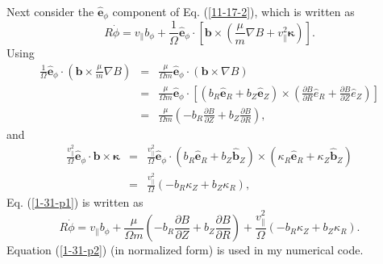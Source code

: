 \documentclass{article}
\begin{document}
Next consider the $\hat{\mathbf{e}}_{\phi}$ component of Eq. (\ref{11-17-2}),
which is written as
\begin{equation}
  \label{1-31-p1} R \dot{\phi} = v_{\parallel} b_{\phi} + \frac{1}{\Omega}
  \hat{\mathbf{e}}_{\phi} \cdot \left[ \mathbf{b} \times \left( \frac{\mu}{m}
  \nabla B + v_{\parallel}^2 \mathbf{\kappa} \right) \right] .
\end{equation}
Using
\begin{eqnarray}
  \frac{1}{\Omega} \hat{\mathbf{e}}_{\phi} \cdot \left( \mathbf{b} \times
  \frac{\mu}{m} \nabla B \right) & = & \frac{\mu}{\Omega m}
  \hat{\mathbf{e}}_{\phi} \cdot (\mathbf{b} \times \nabla B) \nonumber\\
  & = & \frac{\mu}{\Omega m} \hat{\mathbf{e}}_{\phi} \cdot \left[ (b_R
  \hat{\mathbf{e}}_R + b_Z \hat{\mathbf{e}}_Z) \times \left( \frac{\partial
  B}{\partial R} \hat{e}_R + \frac{\partial B}{\partial Z} \hat{e}_Z \right)
  \right] \nonumber\\
  & = & \frac{\mu}{\Omega m} \left( - b_R  \frac{\partial B}{\partial Z} +
  b_Z  \frac{\partial B}{\partial R} \right), 
\end{eqnarray}
and
\begin{eqnarray}
  \frac{v_{\parallel}^2}{\Omega} \hat{\mathbf{e}}_{\phi} \cdot \mathbf{b}
  \times \mathbf{\kappa} & = & \frac{v_{\parallel}^2}{\Omega}
  \hat{\mathbf{e}}_{\phi} \cdot (b_R \hat{\mathbf{e}}_R + b_Z
  \hat{\mathbf{b}}_Z) \times (\kappa_R \hat{\mathbf{e}}_R + \kappa_Z
  \hat{\mathbf{b}}_Z) \nonumber\\
  & = & \frac{v_{\parallel}^2}{\Omega} (- b_R \kappa_Z + b_Z \kappa_R), 
\end{eqnarray}
Eq. (\ref{1-31-p1}) is written as
\begin{equation}
  \label{1-31-p2} R \dot{\phi} = v_{\parallel} b_{\phi} + \frac{\mu}{\Omega m}
  \left( - b_R  \frac{\partial B}{\partial Z} + b_Z  \frac{\partial
  B}{\partial R} \right) + \frac{v_{\parallel}^2}{\Omega} (- b_R \kappa_Z +
  b_Z \kappa_R) .
\end{equation}
Equation (\ref{1-31-p2}) (in normalized form) is used in my numerical code.

\

\
\end{document}
